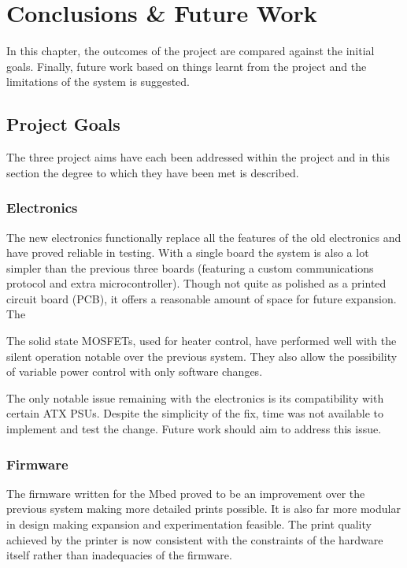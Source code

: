 \chapter{Conclusions \& Future Work}
	
	\label{sec:conclusions}
	
	In this chapter, the outcomes of the project are compared against the initial
	goals. Finally, future work based on things learnt from the project and the
	limitations of the system is suggested.
	
	\section{Project Goals}
		
		The three project aims have each been addressed within the project and in
		this section the degree to which they have been met is described.
		
		\subsection{Electronics}
			
			The new electronics functionally replace all the features of the old
			electronics and have proved reliable in testing.  With a single board the
			system is also a lot simpler than the previous three boards (featuring a
			custom communications protocol and extra microcontroller).  Though not
			quite as polished as a printed circuit board (PCB), it offers a reasonable
			amount of space for future expansion. The
			
			The solid state MOSFETs, used for heater control, have performed well with
			the silent operation notable over the previous system. They also allow the
			possibility of variable power control with only software changes.
			
			The only notable issue remaining with the electronics is its compatibility
			with certain ATX PSUs. Despite the simplicity of the fix, time was not
			available to implement and test the change. Future work should aim to
			address this issue.
		
		\subsection{Firmware}
			
			
			The firmware written for the Mbed proved to be an improvement over the
			previous system making more detailed prints possible. It is also far more
			modular in design making expansion and experimentation feasible. The print
			quality achieved by the printer is now consistent with the constraints of
			the hardware itself rather than inadequacies of the firmware.
			
